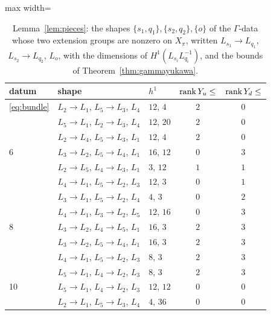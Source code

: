 \begin{table}[t]\small\centering
\caption{Lemma~\ref{lem:pieces}: the shapes $\{s_1,q_1\},\{s_2,q_2\},\{o\}$
of the $\Gamma$-data whose two extension groups are nonzero on $X_\pi$,
written $L_{s_1}\to L_{q_1}$, $L_{s_2}\to L_{q_2}$, $L_o$, with the
dimensions of $H^1(L_{s_i}L_{q_i}^{-1})$, and the bounds of
Theorem~\ref{thm:gammayukawa}.}\label{tab:gammashapes}
\begin{adjustbox}{max width=\linewidth}
\begin{tabular}{@{}lllcc@{}}
\toprule
datum & shape & $h^1$ & $\operatorname{rank} Y_u\le$ & $\operatorname{rank} Y_d\le$\\\midrule
\eqref{eq:bundle} & $L_2\to L_1$, $L_5\to L_3$, $L_4$ & $12$, $4$ & $2$ & $0$\\
 & $L_5\to L_1$, $L_2\to L_3$, $L_4$ & $12$, $20$ & $2$ & $0$\\
 & $L_2\to L_4$, $L_5\to L_3$, $L_1$ & $12$, $4$ & $2$ & $0$\\
6 & $L_3\to L_2$, $L_5\to L_4$, $L_1$ & $16$, $12$ & $0$ & $3$\\
 & $L_2\to L_5$, $L_4\to L_3$, $L_1$ & $3$, $12$ & $1$ & $1$\\
 & $L_4\to L_1$, $L_5\to L_2$, $L_3$ & $12$, $3$ & $0$ & $1$\\
 & $L_3\to L_1$, $L_5\to L_2$, $L_4$ & $4$, $3$ & $0$ & $2$\\
 & $L_4\to L_1$, $L_3\to L_2$, $L_5$ & $12$, $16$ & $0$ & $3$\\
8 & $L_3\to L_2$, $L_4\to L_5$, $L_1$ & $16$, $3$ & $2$ & $3$\\
 & $L_3\to L_2$, $L_5\to L_4$, $L_1$ & $16$, $3$ & $2$ & $3$\\
 & $L_4\to L_1$, $L_5\to L_2$, $L_3$ & $8$, $3$ & $2$ & $3$\\
 & $L_5\to L_1$, $L_4\to L_2$, $L_3$ & $8$, $3$ & $2$ & $3$\\
10 & $L_5\to L_1$, $L_4\to L_2$, $L_3$ & $12$, $12$ & $0$ & $0$\\
 & $L_2\to L_1$, $L_5\to L_3$, $L_4$ & $4$, $36$ & $0$ & $0$\\
\bottomrule
\end{tabular}
\end{adjustbox}
\end{table}

